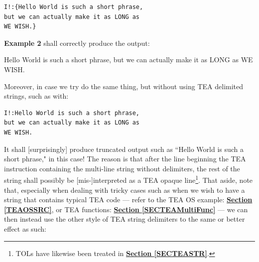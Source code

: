 \documentclass[a4paper, 18pt]{book} %
\begin{document}
{{{\begin{appendices}
  \begin{tcolorbox}[teaterminalstyle, title=TEA MULTI-STRINGS: Example 2: Dealing with Long Strings with Line Breaks, breakable]
  \begin{lstlisting}[language=TEA,breaklines=true,]
I!:{Hello World is such a short phrase,
but we can actually make it as LONG as
WE WISH.}
   \end{lstlisting}
  \end{tcolorbox}

\vspace{2em}


\textbf{Example 2} shall correctly produce the output:



  \vspace{2em}
 \begin{tcbverbatim}[title=Sample OUTPUT from Example 2]
Hello World is such a short phrase,
but we can actually make it as LONG as
WE WISH.
  \end{tcbverbatim}
 \vspace{2em}


Moreover, in case we try do the same thing, but without using TEA delimited strings, such as with:



\vspace{2em}

  \begin{tcolorbox}[teaterminalstyle, title=TEA MULTI-STRINGS: Example 3: Dealing with Long Strings with Line Breaks, breakable]
  \begin{lstlisting}[language=TEA,breaklines=true,]
I!:Hello World is such a short phrase,
but we can actually make it as LONG as
WE WISH.
   \end{lstlisting}
  \end{tcolorbox}

\vspace{2em}


It shall [surprisingly] produce truncated output such as ``Hello World is such a short phrase," in this case! The reason is that after the line beginning the TEA instruction containing the multi-line string without delimiters, the rest of the string shall possibly be [mis-]interpreted as a TEA opaque line\footnote{TOLs have likewise been treated in \textbf{\hyperref[SECTEASTR]{Section \ref{SECTEASTR}}}.}. That aside, note that, especially when dealing with tricky cases such as when we wish to have a string that contains typical TEA code --- refer to the TEA OS example: \textbf{\hyperref[TEAOSSRC]{Section \ref{TEAOSSRC}}}, or TEA functions: \textbf{\hyperref[SECTEAMultiFunc]{Section \ref{SECTEAMultiFunc}}} --- we can then instead use the other style of TEA string delimiters to the same or better effect as such:




\end{appendices}}}}
\end{document}
